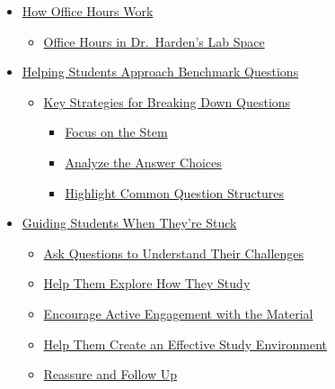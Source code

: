 \documentclass[
]{article}
\providecommand{\tightlist}{%
  \setlength{\itemsep}{0pt}\setlength{\parskip}{0pt}}
\begin{document}
\begin{itemize}
\tightlist
\item
  \protect\hyperlink{how-office-hours-work}{How Office Hours Work}

  \begin{itemize}
  \tightlist
  \item
    \protect\hyperlink{office-hours-in-dr-hardens-lab-space}{Office Hours in Dr.~Harden's Lab Space}\\
  \end{itemize}
\item
  \protect\hyperlink{helping-students-approach-benchmark-questions}{Helping Students Approach Benchmark Questions}

  \begin{itemize}
  \tightlist
  \item
    \protect\hyperlink{key-strategies-for-breaking-down-questions}{Key Strategies for Breaking Down Questions}

    \begin{itemize}
    \tightlist
    \item
      \protect\hyperlink{focus-on-the-stem}{Focus on the Stem}\\
    \item
      \protect\hyperlink{analyze-the-answer-choices}{Analyze the Answer Choices}\\
    \item
      \protect\hyperlink{highlight-common-question-structures}{Highlight Common Question Structures}\\
    \end{itemize}
  \end{itemize}
\item
  \protect\hyperlink{guiding-students-when-theyre-stuck}{Guiding Students When They're Stuck}

  \begin{itemize}
  \tightlist
  \item
    \protect\hyperlink{ask-questions-to-understand-their-challenges}{Ask Questions to Understand Their Challenges}\\
  \item
    \protect\hyperlink{help-them-explore-how-they-study}{Help Them Explore How They Study}\\
  \item
    \protect\hyperlink{encourage-active-engagement-with-the-material}{Encourage Active Engagement with the Material}\\
  \item
    \protect\hyperlink{help-them-create-an-effective-study-environment}{Help Them Create an Effective Study Environment}\\
  \item
    \protect\hyperlink{reassure-and-follow-up}{Reassure and Follow Up}
  \end{itemize}
\end{itemize}
\end{document}
